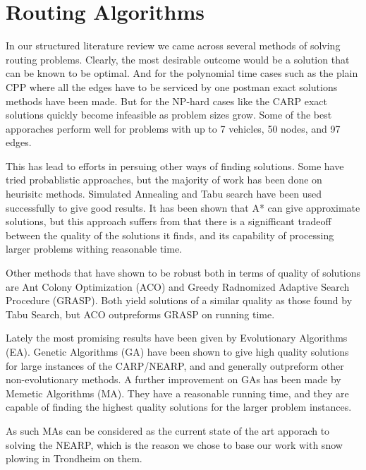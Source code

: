 

\section{Routing Algorithms} %
\label{sec:routing_algorithms}

In our structured literature review we came across several methods of solving routing problems. Clearly, the most desirable outcome would be a solution that can be known to be optimal. And for the polynomial time cases such as the plain CPP where all the edges have to be serviced by one postman exact solutions methods have been made. But for the NP-hard cases like the CARP exact solutions quickly become infeasible as problem sizes grow. Some of the best apporaches perform well for problems with up to 7 vehicles, 50 nodes, and 97 edges.

This has lead to efforts in persuing other ways of finding solutions. Some have tried probablistic approaches, but the majority of work has been done on heurisitc methods. Simulated Annealing and Tabu search have been used successfully to give good results. It has been shown that A* can give approximate solutions, but this approach suffers from that there is a signifficant tradeoff between the quality of the solutions it finds, and its capability of processing larger problems withing reasonable time.

Other methods that have shown to be robust both in terms of quality of solutions are Ant Colony Optimization (ACO) and Greedy Radnomized Adaptive Search Procedure (GRASP). Both yield solutions of a similar quality as those found by Tabu Search, but ACO outpreforms GRASP on running time.

Lately the most promising results have been given by Evolutionary Algorithms (EA). Genetic Algorithms (GA) have been shown to give high quality solutions for large instances of the CARP/NEARP, and and generally outpreform other non-evolutionary methods. A further improvement on GAs has been made by Memetic Algorithms (MA). They have a reasonable running time, and they are capable of finding the highest quality solutions for the larger problem instances.

As such MAs can be considered as the current state of the art apporach to solving the NEARP, which is the reason we chose to base our work with snow plowing in Trondheim on them.

